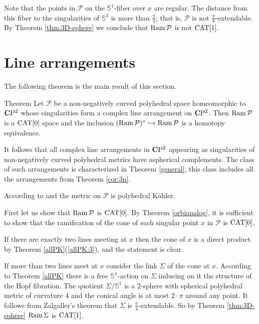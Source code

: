\documentclass{compositio}
\begin{document}
Note that the points in $\mathcal{P}$ 
on the $\mathbb{S}^1$-fiber over $x$ are regular.
The distance from this fiber to the singularities of
$\mathbb{S}^3$ is more than $\frac{\pi}{4}$;
that is, $\mathcal{P}$ is not $\frac{\pi}{4}$-extendable.
By Theorem \ref{thm:3D-sphere} we conclude that $\mathop{\rm Ram}\nolimits \mathcal{P}$ is not $\mathrm{CAT}[1]$.
\qeds



\section{Line arrangements}\label{sec:linearrangement}

The following theorem is the main result of this section.

\begin{thm}{Theorem}\label{linearrangement} Let $\mathcal{P}$ be a non-negatively curved polyhedral space homeomorphic to $\mathbf{C}\mathrm{P}^2$ whose singularities form a complex line arrangement on $\mathbf{C}\mathrm{P}^2$.
Then $\mathop{\rm Ram}\nolimits \mathcal{P}$ is a $\mathrm{CAT}[0]$ space and the inclusion $(\mathop{\rm Ram}\nolimits \mathcal{P})^\circ\hookrightarrow\mathop{\rm Ram}\nolimits \mathcal{P}$ is a homotopy equivalence.
\end{thm}

It follows that all complex line arrangements in $\mathbf{C}\mathrm{P}^2$
appearing as singularities of non-negatively curved polyhedral metrics
have aspherical complements. The class of such arrangements is characterized in
Theorem \ref{general},
this class includes all the arrangements from Theorem \ref{cor:3n}.

According to \cite{cheeger}
and \cite{panov}
the metric on $\mathcal{P}$ is
polyhedral K\"ahler.

First let us show that $\mathop{\rm Ram}\nolimits \mathcal P$ is $\mathrm{CAT}[0]$.
By Theorem \ref{orbianalog},
it is sufficient to show that the ramification of the cone of each singular point $x$ in $\mathcal P$ is $\mathrm{CAT}[0]$.

If there are exactly two lines meeting at $x$ then the cone of $x$ is a direct product by Theorem \ref{allPK}(\ref{allPK:3}),
and the statement is clear.

If  more than two lines meet at $x$ consider the link $\Sigma$
of the cone at $x$. According to Theorem \ref{allPK} there is a free $\mathbb{S}^1$-action on $\Sigma$
inducing on it the structure of the Hopf fibration.
The quotient $\Sigma/\mathbb{S}^1$ is a $2$-sphere
with spherical polyhedral metric of curvature $4$
and the conical angle is at most $2\cdot\pi$
around any point.
It follows from Zalgaller's theorem
that $\Sigma$ is $\frac{\pi}{4}$-extendable. So by Theorem \ref{thm:3D-sphere}
$\mathop{\rm Ram}\nolimits \Sigma$ is $\mathrm{CAT}[1]$.
\end{document}
